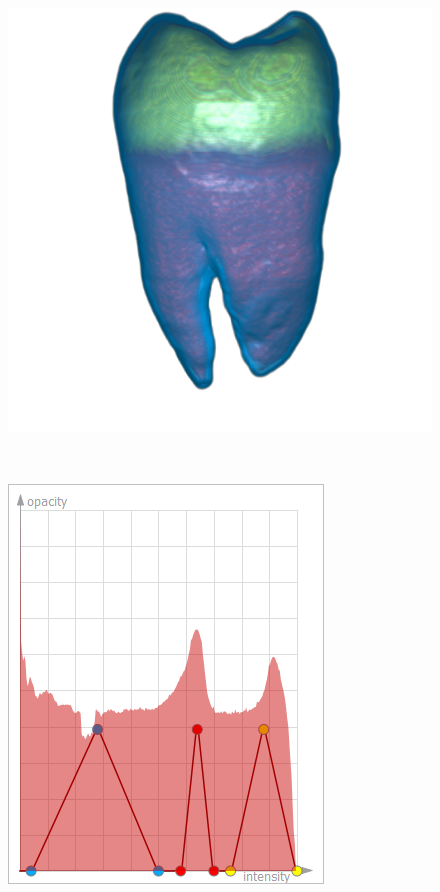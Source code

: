 \begin{figure}
	\centering
	\begin{minipage}{.29\textwidth}
		\includegraphics[width=1\linewidth]{images/tooth_naive}
		\subcaption{}
	\end{minipage}~
	\begin{minipage}{.2\textwidth}
		\includegraphics[width=1\linewidth]{figures/tf_tooth_naive}

\end{minipage}
\end{figure}
